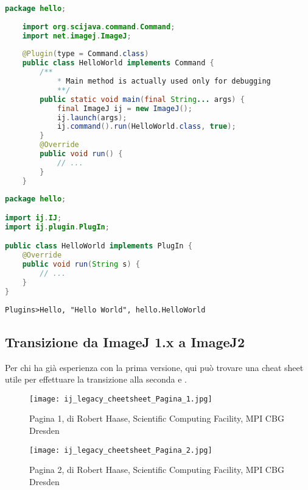 \begin{lstlisting}[language=Java,caption={Esempio semplice di un plugin Fiji in cui si fa uso di ImageJ2},label={lst:ImageJ2}]
    package hello;
    
    import org.scijava.command.Command;
    import net.imagej.ImageJ;
    
    @Plugin(type = Command.class)
    public class HelloWorld implements Command {
        /**
            * Main method is actually used only for debugging
            **/
        public static void main(final String... args) {
            final ImageJ ij = new ImageJ();
            ij.launch(args);
            ij.command().run(HelloWorld.class, true);
        }
        @Override
        public void run() {
            // ...
        }
    }
\end{lstlisting}

\begin{lstlisting}[language=Java,caption={Esempio semplice di un plugin Fiji in cui viene utilizzato ImageJ 1.x}, label={lst:ImageJ1}]
package hello;

import ij.IJ;
import ij.plugin.PlugIn;

public class HelloWorld implements PlugIn {
    @Override
    public void run(String s) {
    	// ...
    }
}
\end{lstlisting}

\begin{lstlisting}[caption={Esempio di file plugins.config obbligatorio nel caso dell'uso di ImageJ 1.x}, label={lst:ImageJ1Config}]
	Plugins>Hello, "Hello World", hello.HelloWorld
\end{lstlisting}

\subsection{Transizione da ImageJ 1.x a ImageJ2}
\noindent Per chi ha già esperienza con la prima versione, qui può trovare una cheat sheet utile per effettuare la transizione alla seconda  e .

\begin{figure}[H]
\centering
\texttt{[image: ij\_legacy\_cheetsheet\_Pagina\_1.jpg]}
\caption{Pagina 1, di Robert Haase, Scientific Computing Facility, MPI CBG Dresden}
\label{fig:6}
\end{figure}

\begin{figure}[H]
\centering
\texttt{[image: ij\_legacy\_cheetsheet\_Pagina\_2.jpg]}
\caption{Pagina 2, di Robert Haase, Scientific Computing Facility, MPI CBG Dresden}
\label{fig:7}
\end{figure}



